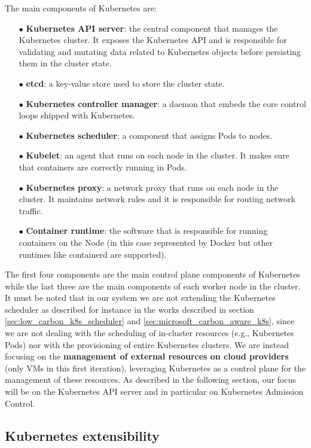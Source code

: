 The main components of Kubernetes are:
\begin{itemize}[itemsep=0.2pt, topsep=1pt]
    \item[$\bullet$] \textbf{Kubernetes API server}: the central component that manages the Kubernetes cluster. It exposes the Kubernetes API and is responsible for validating and mutating data related to Kubernetes objects before persisting them in the cluster state.
    \item[$\bullet$] \textbf{etcd}: a key-value store used to store the cluster state.
    \item[$\bullet$] \textbf{Kubernetes controller manager}: a daemon that embeds the core control loops shipped with Kubernetes.
    \item[$\bullet$] \textbf{Kubernetes scheduler}: a component that assigns Pods to nodes.
    \item[$\bullet$] \textbf{Kubelet}: an agent that runs on each node in the cluster. It makes sure that containers are correctly running in Pods.
    \item[$\bullet$] \textbf{Kubernetes proxy}: a network proxy that runs on each node in the cluster. It maintains network rules and it is responsible for routing network traffic.
    \item[$\bullet$] \textbf{Container runtime}: the software that is responsible for running containers on the Node (in this case represented by Docker but other runtimes like containerd are supported).
\end{itemize}

The first four components are the main control plane components of Kubernetes while the last three are the main components of each worker node in the cluster.
It must be noted that in our system we are not extending the Kubernetes scheduler as described for instance in the works described in section \ref{sec:low_carbon_k8s_scheduler} and \ref{sec:microsoft_carbon_aware_k8s}, since we are not dealing with the scheduling of in-cluster resources (e.g., Kubernetes Pods) nor with the provisioning of entire Kubernetes clusters.
We are instead focusing on the \textbf{management of external resources on cloud providers} (only VMs in this first iteration), leveraging Kubernetes as a control plane for the management of these resources.
As described in the following section, our focus will be on the Kubernetes API server and in particular on Kubernetes Admission Control.

\subsection{Kubernetes extensibility}
\label{sec:kubernetes_extensibility}

